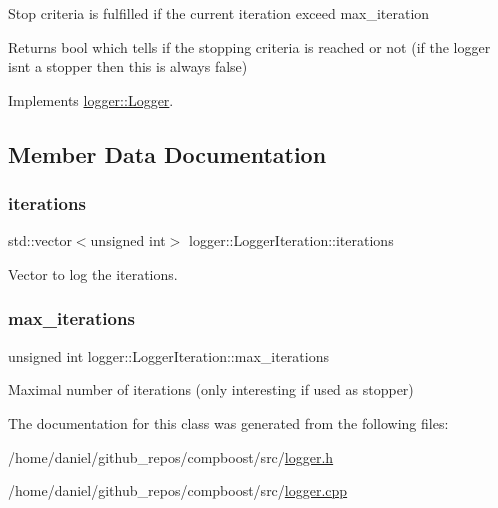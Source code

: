 Stop criteria is fulfilled if the current iteration exceed {\ttfamily max\+\_\+iteration} 

\begin{DoxyReturn}{Returns}
{\ttfamily bool} which tells if the stopping criteria is reached or not (if the logger isn\textquotesingle{}t a stopper then this is always false) 
\end{DoxyReturn}


Implements \hyperlink{classlogger_1_1_logger_aed91421c07062b91cee158ef2bda7ae8}{logger\+::\+Logger}.



\subsection{Member Data Documentation}
\mbox{\label{classlogger_1_1_logger_iteration_a3879ea4e72c8626df033b5345e392fd9}} 
\subsubsection{\texorpdfstring{iterations}{iterations}}
{\footnotesize\ttfamily std\+::vector$<$unsigned int$>$ logger\+::\+Logger\+Iteration\+::iterations\hspace{0.3cm}{\ttfamily [private]}}



Vector to log the iterations. 

\mbox{\label{classlogger_1_1_logger_iteration_a30cfbf3c8c363807826b754f19195c44}} 
\subsubsection{\texorpdfstring{max\+\_\+iterations}{max\_iterations}}
{\footnotesize\ttfamily unsigned int logger\+::\+Logger\+Iteration\+::max\+\_\+iterations\hspace{0.3cm}{\ttfamily [private]}}



Maximal number of iterations (only interesting if used as stopper) 



The documentation for this class was generated from the following files\+:\begin{DoxyCompactItemize}
\item 
/home/daniel/github\+\_\+repos/compboost/src/\hyperlink{logger_8h}{logger.\+h}\item 
/home/daniel/github\+\_\+repos/compboost/src/\hyperlink{logger_8cpp}{logger.\+cpp}\end{DoxyCompactItemize}
